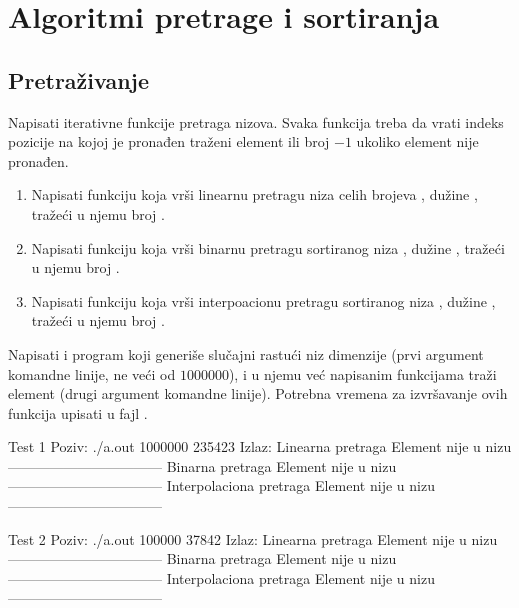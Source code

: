 
\chapter{Algoritmi pretrage i sortiranja}

\section{Pretraživanje}

\begin{Exercise}[label=401]
  Napisati iterativne funkcije pretraga nizova. Svaka funkcija treba
  da vrati indeks pozicije na kojoj je pronađen traženi element ili
  broj $-1$ ukoliko element nije pronađen.
  \begin{enumerate}  
  \item Napisati funkciju koja vrši linearnu pretragu niza 
    celih brojeva , dužine , tražeći u njemu broj
    .  
  \item Napisati funkciju koja vrši binarnu pretragu
    sortiranog niza , dužine , tražeći u njemu broj .
  \item Napisati funkciju koja vrši interpoacionu pretragu
    sortiranog niza , dužine , tražeći u njemu broj .
  \end{enumerate}
  Napisati i program koji generiše slučajni rastući niz dimenzije
   (prvi argument komandne linije, ne veći od $1000000$), i u
  njemu već napisanim funkcijama traži element  (drugi
  argument komandne linije). Potrebna vremena za izvršavanje ovih
  funkcija upisati u fajl .
  
\begin{miditest}
\begin{test}{Test 1}
Poziv: ./a.out 1000000 235423                
Izlaz:
  Linearna pretraga                           
  Element nije u nizu
  ---------------------------------
  Binarna pretraga
  Element nije u nizu
  ---------------------------------
  Interpolaciona pretraga
  Element nije u nizu
  ---------------------------------
\end{test}
\end{miditest}
\begin{miditest}
\begin{test}{Test 2}
Poziv: ./a.out 100000 37842
Izlaz:
  Linearna pretraga                           
  Element nije u nizu
  ---------------------------------
  Binarna pretraga
  Element nije u nizu
  ---------------------------------
  Interpolaciona pretraga
  Element nije u nizu
  ---------------------------------
\end{test}
\end{miditest}


\end{Exercise}


